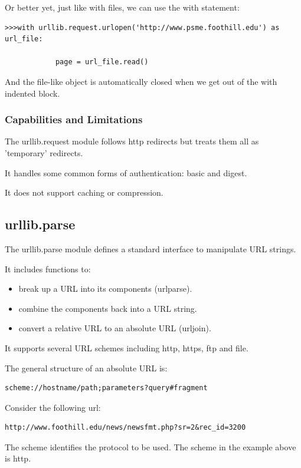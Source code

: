 \documentclass{article}
\begin{document}
Or better yet, just like with files, we can use the with statement:

\begin{lstlisting}
>>>with urllib.request.urlopen('http://www.psme.foothill.edu') as url_file:

            page = url_file.read()
\end{lstlisting}

And the file-like object is automatically closed when we get out of the with indented block.

\subsubsection{Capabilities and Limitations}

The urllib.request module follows http redirects but treats them all as 'temporary' redirects.

It handles some common forms of authentication: basic and digest.

It does not support caching or compression.

\subsection{urllib.parse}
The urllib.parse module defines a standard interface to manipulate URL strings.

It includes functions to:
\begin{itemize}
\item break up a URL into its components (urlparse).
\item combine the components back into a URL string.
\item convert a relative URL to an absolute URL (urljoin).
\end{itemize}

It supports several URL schemes including http, https, ftp and file.

The general structure of an absolute URL is:

\begin{lstlisting}
scheme://hostname/path;parameters?query#fragment
\end{lstlisting}

Consider the following url:

\begin{lstlisting}
http://www.foothill.edu/news/newsfmt.php?sr=2&rec_id=3200
\end{lstlisting}

The scheme identifies the protocol to be used.  The scheme in the example above is  http. 
\end{document}
